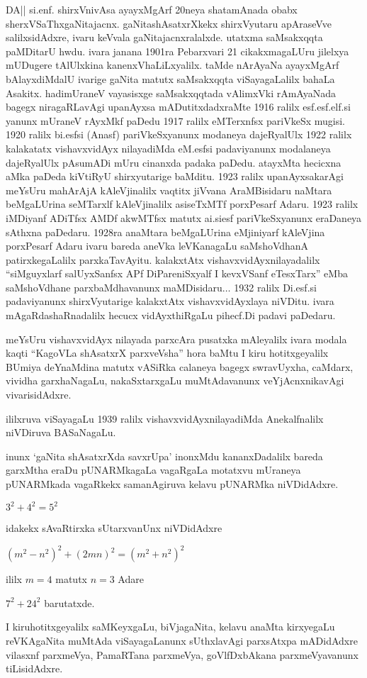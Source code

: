 DA|| si.enf. shirxVnivAsa ayayxMgArf {\rm 20}neya shatamAnada obabx sherxVSaThxgaNitajacnx. gaNitashAsatxrXkekx shirxVyutaru apAraseVve salilxsidAdxre, ivaru keVvala gaNitajacnxralalxde. utatxma saMsakxqqta paMDitarU hwdu. ivara janana {\rm 1901}ra Pebarxvari {\rm 21} cikakxmagaLUru jilelxya mUDugere tAlUlxkina kanenxVhaLiLxyalilx. taMde nArAyaNa ayayxMgArf bAlayxdiMdalU ivarige gaNita matutx saMsakxqqta viSayagaLalilx bahaLa Asakitx. hadimUraneV vayasisxge saMsakxqqtada vAlimxVki rAmAyaNada bagegx niragaRLavAgi upanAyxsa mADutitxdadxraMte {\rm 1916} ralilx esf.esf.elf.si yanunx mUraneV rAyxMkf paDedu {\rm 1917} ralilx eMTerxnfsx pariVkeSx mugisi. {\rm 1920} ralilx bi.esfsi (Anasf) pariVkeSxyanunx modaneya dajeRyalUlx {\rm 1922} ralilx kalakatatx vishavxvidAyx nilayadiMda eM.esfsi padaviyanunx modalaneya dajeRyalUlx pAsumADi mUru cinanxda padaka paDedu. atayxMta hecicxna aMka paDeda kiVtiRyU shirxyutarige baMditu. {\rm 1923} ralilx upanAyxsakarAgi meYsUru mahArAjA kAleVjinalilx vaqtitx jiVvana AraMBisidaru naMtara beMgaLUrina seMTarxlf kAleVjinalilx asiseTxMTf porxPesarf Adaru. {\rm 1923} ralilx iMDiyanf ADiTfsx AMDf akwMTfsx matutx ai.siesf pariVkeSxyanunx eraDaneya sAthxna paDedaru. {\rm 1928}ra anaMtara beMgaLUrina eMjiniyarf kAleVjina porxPesarf Adaru ivaru bareda aneVka leVKanagaLu saMshoVdhanA patirxkegaLalilx parxkaTavAyitu. kalakxtAtx vishavxvidAyxnilayadalilx ``siMguyxlarf salUyxSanfsx APf DiPareniSxyalf I kevxVSanf eTesxTarx'' eMba saMshoVdhane parxbaMdhavanunx maMDisidaru$\ldots$ {\rm 1932} ralilx Di.esf.si padaviyanunx shirxVyutarige kalakxtAtx vishavxvidAyxlaya niVDitu. ivara mAgaRdashaRnadalilx hecucx vidAyxthiRgaLu pihecf.Di padavi paDedaru.

meYsUru vishavxvidAyx nilayada parxcAra pusatxka mAleyalilx ivara modala kaqti ``KagoVLa shAsatxrX parxveVsha'' hora baMtu I kiru hotitxgeyalilx BUmiya deYnaMdina matutx vASiRka calaneya bagegx swravUyxha, caMdarx, vividha garxhaNagaLu, nakaSxtarxgaLu muMtAdavanunx veYjAcnxnikavAgi vivarisidAdxre.

ililxruva viSayagaLu {\rm 1939} ralilx vishavxvidAyxnilayadiMda Anekalfnalilx niVDiruva BASaNagaLu.

inunx `gaNita shAsatxrXda savxrUpa' inonxMdu kananxDadalilx bareda garxMtha eraDu pUNARMkagaLa vagaRgaLa motatxvu mUraneya pUNARMkada vagaRkekx samanAgiruva kelavu pUNARMka niVDidAdxre.
\begin{center}
$3^2+4^2=5^2$

idakekx sAvaRtirxka sUtarxvanUnx niVDidAdxre

$(m^2-n^2)^2+(2mn)^2=(m^2+n^2)^2$

ililx $m=4$ matutx $n=3$ Adare

$7^2+24^{2}$ barutatxde.
\end{center}
I kiruhotitxgeyalilx saMKeyxgaLu, biVjagaNita, kelavu anaMta kirxyegaLu reVKAgaNita muMtAda viSayagaLanunx sUthxlavAgi parxsAtxpa mADidAdxre vilasxnf parxmeVya, PamaRTana parxmeVya, goVlfDxbAkana parxmeVyavanunx tiLisidAdxre.

